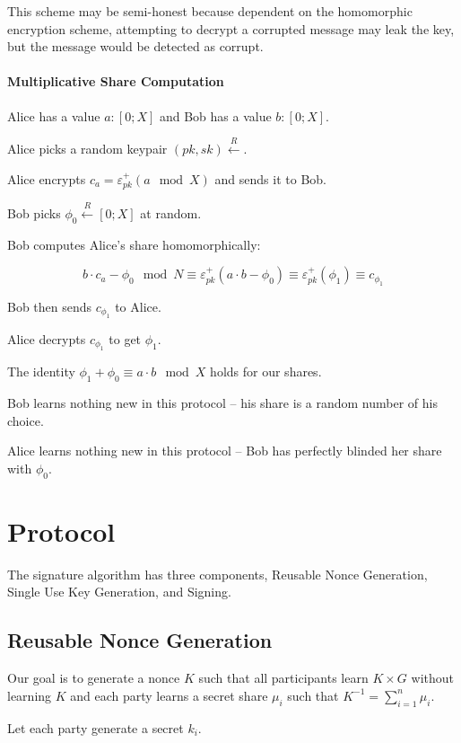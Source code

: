 \documentclass{article}
\newcommand{\addencrypt}{\varepsilon^{+}}
\begin{document}
This scheme may be semi-honest because dependent on the homomorphic encryption scheme, attempting to decrypt a corrupted message may leak the key, but the message would be detected as corrupt.

\paragraph{Multiplicative Share Computation }
Alice has a value $a : [0; X]$ and Bob has a value $b : [0; X]$.

Alice picks a random keypair $(pk, sk) \xleftarrow{R}$.

Alice encrypts  $c_a = \addencrypt_{pk}(a \mod X)$ and sends it to Bob.

Bob picks $\phi_0 \xleftarrow{R} [0; X]$ at random.

Bob computes Alice's share homomorphically:

$$b\cdot c_a - \phi_0 \mod N \equiv \addencrypt_{pk}(a\cdot b - \phi_0) \equiv \addencrypt_{pk}(\phi_1) \equiv c_{\phi_1}$$

Bob then sends $c_{\phi_1}$ to Alice.

Alice decrypts $c_{\phi_1}$ to get $\phi_1$.

The identity
$\phi_1 + \phi_0 \equiv a\cdot b \mod X$ holds for our shares.

Bob learns nothing new in this protocol -- his share is a random number of his choice.

Alice learns nothing new in this protocol -- Bob has perfectly blinded her share  with $\phi_0$.








\section{Protocol}

The signature algorithm has three components, Reusable Nonce Generation, Single Use Key Generation, and Signing.

\subsection{Reusable Nonce Generation}
Our goal is to generate a nonce $K$ such that all participants learn
$K\times G$ without learning $K$ and each party learns a secret share $\mu_i$ such that $K^{-1} = \sum_{i=1}^{n}\mu_i$.

Let each party generate a secret $k_i$.
\end{document}
